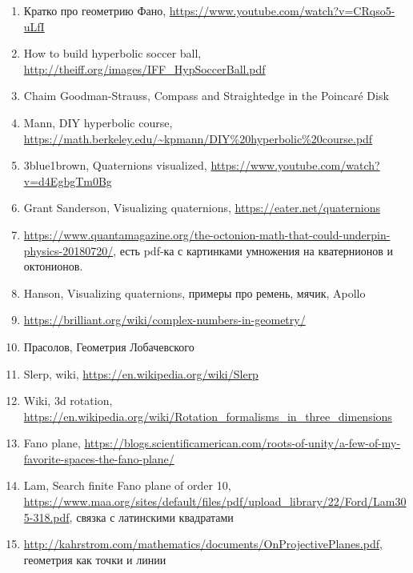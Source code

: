 \documentclass[12pt]{article}
\theoremstyle{definition}
\begin{document}
\begin{enumerate}
\item Кратко про геометрию Фано, \url{https://www.youtube.com/watch?v=CRqso5-uLfI}
\item How to build hyperbolic soccer ball, \url{http://theiff.org/images/IFF_HypSoccerBall.pdf}
\item Chaim Goodman-Strauss, Compass and Straightedge in the Poincaré Disk
\item Mann, DIY hyperbolic course, \url{https://math.berkeley.edu/~kpmann/DIY%20hyperbolic%20course.pdf}
\item 3blue1brown, Quaternions visualized, \url{https://www.youtube.com/watch?v=d4EgbgTm0Bg}
\item Grant Sanderson, Visualizing quaternions, \url{https://eater.net/quaternions}
\item \url{https://www.quantamagazine.org/the-octonion-math-that-could-underpin-physics-20180720/}, есть pdf-ка
с картинками умножения на кватернионов и октонионов. 
\item Hanson, Visualizing quaternions, примеры про ремень, мячик, Apollo
\item \url{https://brilliant.org/wiki/complex-numbers-in-geometry/}
\item Прасолов, Геометрия Лобачевского
\item Slerp, wiki, \url{https://en.wikipedia.org/wiki/Slerp}
\item Wiki, 3d rotation, \url{https://en.wikipedia.org/wiki/Rotation_formalisms_in_three_dimensions}
\item Fano plane, \url{https://blogs.scientificamerican.com/roots-of-unity/a-few-of-my-favorite-spaces-the-fano-plane/}
\item Lam, Search finite Fano plane of order 10, \url{https://www.maa.org/sites/default/files/pdf/upload_library/22/Ford/Lam305-318.pdf},
связка с латинскими квадратами
\item \url{http://kahrstrom.com/mathematics/documents/OnProjectivePlanes.pdf}, геометрия как точки и линии

\end{enumerate}

\printbibliography[heading=none]
\end{document}

